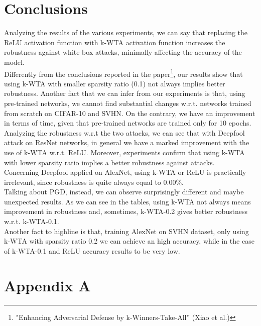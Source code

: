 \documentclass[a4paper]{article}
\begin{document}
	\section{Conclusions}
	Analyzing the results of the various experiments, we can say that replacing the ReLU activation function with k-WTA activation function increases the robustness against white box attacks, minimally affecting the accuracy of the model.\\
	Differently from the conclusions reported in the paper\footnote{"Enhancing Adversarial Defense by k-Winners-Take-All” (Xiao et al.)}, our results show that using k-WTA with smaller sparsity ratio (0.1) not always implies better robustness. Another fact that we can infer from our experiments is that, using pre-trained networks, we cannot find substantial changes w.r.t. networks trained from scratch on CIFAR-10 and SVHN. On the contrary, we have an improvement in terms of time, given that pre-trained networks are trained only for 10 epochs.\\
	Analyzing the robustness w.r.t the two attacks, we can see that with Deepfool attack on ResNet networks, in general we have a marked improvement with the use of k-WTA w.r.t. ReLU. Moreover, experiments confirm that using k-WTA with lower sparsity ratio implies a better robustness against attacks.\\
	Concerning Deepfool applied on AlexNet, using k-WTA or ReLU is practically irrelevant, since robustness is quite always equal to 0.00\%.\\
	Talking about PGD, instead, we can observe surprisingly different and maybe unexpected results. As we can see in the tables, using k-WTA not always means improvement in robustness and, sometimes, k-WTA-0.2 gives better robustness w.r.t. k-WTA-0.1.\\
	Another fact to highline is that, training AlexNet on SVHN dataset, only using k-WTA with sparsity ratio 0.2 we can achieve an high accuracy, while in the case of k-WTA-0.1 and ReLU accuracy results to be very low.
	
	\section{Appendix A}
\end{document}
